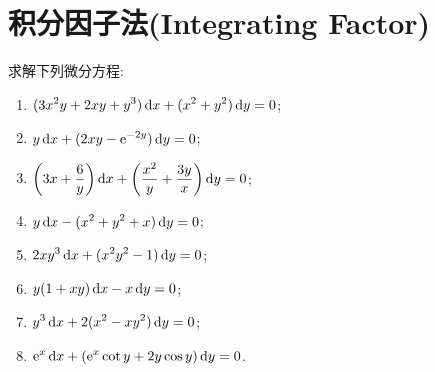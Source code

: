 \section{积分因子法(Integrating Factor)}



\begin{exercise}
  求解下列微分方程:
  \begin{enumerate}[(1)]
  \item $\displaystyle(3x^2y+2xy+y^3)\mathop{}\!\mathrm{d} x+(x^2+y^2)\mathop{}\!\mathrm{d} y=0$;
  \item $\displaystyle y\mathop{}\!\mathrm{d} x+(2xy-\mathrm{e}^{-2y})\mathop{}\!\mathrm{d} y=0$;
  \item $\displaystyle\left(3x+\frac{6}{y}\right)\mathop{}\!\mathrm{d} x+\left(\frac{x^2}{y}+\frac{3y}{x}\right)\mathop{}\!\mathrm{d} y=0$;
  \item $\displaystyle y\mathop{}\!\mathrm{d} x-(x^2+y^2+x)\mathop{}\!\mathrm{d} y=0$;
  \item $\displaystyle 2xy^3\mathop{}\!\mathrm{d} x+(x^2y^2-1)\mathop{}\!\mathrm{d} y=0$;
  \item $\displaystyle y(1+xy)\mathop{}\!\mathrm{d} x-x\mathop{}\!\mathrm{d} y=0$;
  \item $\displaystyle y^3\mathop{}\!\mathrm{d} x+2(x^2-xy^2)\mathop{}\!\mathrm{d} y=0$;
  \item $\displaystyle\mathrm{e}^x\mathop{}\!\mathrm{d} x+(\mathrm{e}^x\cot y+2y\cos y)\mathop{}\!\mathrm{d} y=0$.
  \end{enumerate}
\end{exercise}

